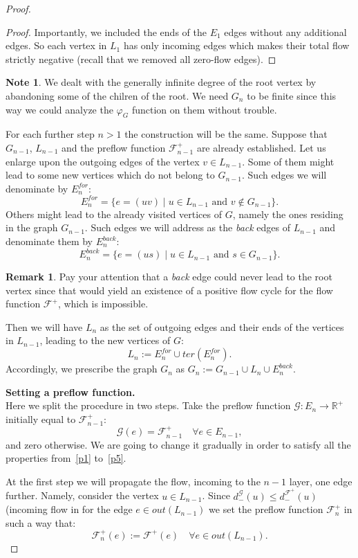 \documentclass[12pt]{article}
\renewcommand{\cal}[1]{\mathcal{#1}}
\renewcommand{\leq}{\leqslant}
\newcommand{\gfi}{\varphi_{G}}
\theoremstyle{definition}
\newtheorem{remark}{Remark}
\newtheorem*{note}{Note}
\newcommand{\flowpos}{\mathcal{F}^{+}}
\newcommand{\flowposn}[1]{\mathcal{F}_{#1}^{+}}
\newcommand{\ter}{ter}
\newcommand{\eout}{out}
\newcommand{\eback}{E^{back}}
\newcommand{\efor}{E^{for}}
\numberwithin{remark}{section}
\numberwithin{theorem}{section}
\numberwithin{prop}{section}
\numberwithin{equation}{section}
\numberwithin{lemma}{section}
\numberwithin{prop_under_lemma}{lemma}
\begin{document}
\begin{proof}
\begin{proof}
        Importantly, we included the ends of the $E_1$ edges without any additional edges.
        So each vertex in $L_1$ has only incoming edges which makes their total flow strictly negative (recall that we removed all zero-flow edges).
      \end{proof}
      \begin{note}
        We dealt with the generally infinite degree of the root vertex by abandoning some of the chilren of the root.
        We need $G_n$ to be finite since this way we could analyze the $\gfi$ function on them without trouble.
      \end{note}
      For each further step $n > 1$ the construction will be the same.
      Suppose that $G_{n-1}$, $L_{n-1}$ and the preflow function $\flowposn{n-1}$ are already established.
      Let us enlarge upon the outgoing edges of the vertex $v \in L_{n-1}$.
      Some of them might lead to some new vertices which do not belong to $G_{n-1}$.
      Such edges we will denominate by $\efor_n$:
      \[
        \efor_n = \Big\{ e = (uv) \mid u \in L_{n-1} \text{ and } v \notin G_{n-1}\Big\}.
      \]
      Others might lead to the already visited vertices of $G$, namely the ones residing in the graph $G_{n-1}$.
      Such edges we will address as the \emph{back} edges of $L_{n-1}$ and denominate them by $\eback_n$:
      \[
        \eback_n = \Big\{e = (us) \mid u \in L_{n-1} \text{ and } s \in G_{n-1}\Big\}.
      \]
      \begin{remark}
        Pay your attention that a \emph{back} edge could never lead to the root vertex since that
          would yield an existence of a positive flow cycle for the flow function $\flowpos$,
          which is impossible.
      \end{remark}
      Then we will have $L_n$ as the set of outgoing edges and their ends of the vertices in $L_{n-1}$, leading to the new vertices of $G$:
      \[
        L_n := \efor_n \cup \ter(\efor_n).
      \]
      Accordingly, we prescribe the graph $G_n$ as $G_n := G_{n-1} \cup L_n \cup \eback_n$.
      
      \noindent\textbf{Setting a preflow function.}\\
      \noindent Here we split the procedure in two steps.
      Take the preflow function $\cal{G}: E_n \to \mathbb{R}^{+}$ initially equal to $\flowposn{n-1}$:
      \[
        \cal{G}(e) = \flowposn{n-1} \quad \forall e \in E_{n-1},
      \]
      and zero otherwise.
      We are going to change it gradually in order to satisfy all the properties from~\ref{p1} to~\ref{p5}.
      
      At the first step we will propagate the flow, incoming to the $n-1$ layer, one edge further.
      Namely, consider the vertex $u \in L_{n-1}$. Since $d^{\cal{G}}_{-}(u) \leq d^{\flowpos}_{-}(u)$ (incoming flow
        in
      for the edge $e \in \eout(L_{n-1})$ we set the preflow function $\flowposn{n}$ in such a way that:
      \[
        \flowposn{n}(e) := \flowpos(e) \quad \forall e \in \eout(L_{n-1}).
      \]

      
    \end{proof}
\end{document}
